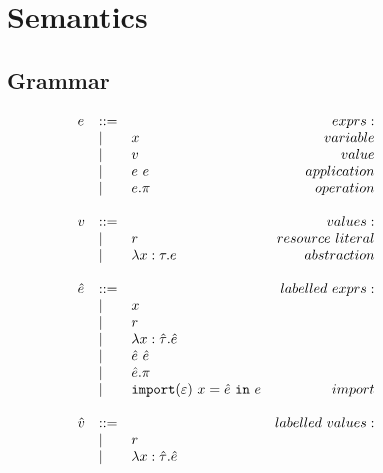 \chapter{Semantics}

\section{Grammar}

\begin{figure}[h]
\vspace{-5pt}

\[
\begin{array}{lll}

\begin{array}{lllr}

e & ::= & ~ & exprs: \\
	& | & x & variable \\
	& | & v & value \\
	& | & e ~ e & application \\
	& | & e.\pi & operation \\
	&&\\

v & ::= & ~ & values: \\
	& | & r & resource~literal \\
	& | & \lambda x: \tau.e & abstraction \\
	&&\\
	
\hat e & ::= & ~ & labelled~exprs: \\
	& | & x \\
	& | & r \\
	& | & \lambda x: \hat \tau.\hat e \\
	& | & \hat e ~ \hat e \\
	& | & \hat e.\pi \\
	& | & \mathtt{import}(\varepsilon)~x = \hat e~\mathtt{in}~e & import \\
	&&\\

\hat v & ::= & ~ & labelled~values: \\
	& | & r \\
	& | & \lambda x: \hat \tau.\hat e \\
	&&\\

\end{array}

& ~~~~~~~~&

\begin{array}{lllr}


\end{array}
\end{array}\]
\end{figure}
